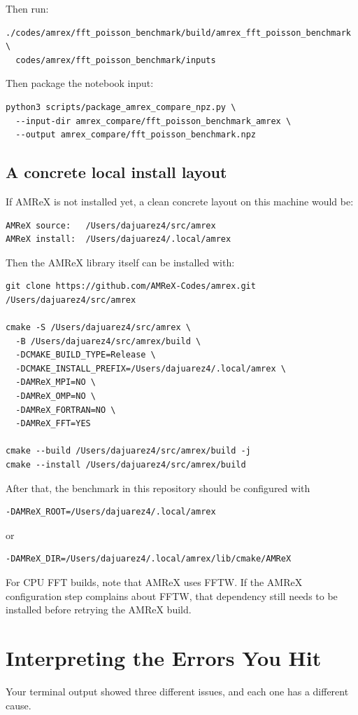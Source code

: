 \documentclass[11pt]{article}
\begin{document}
Then run:
\begin{verbatim}
./codes/amrex/fft_poisson_benchmark/build/amrex_fft_poisson_benchmark \
  codes/amrex/fft_poisson_benchmark/inputs
\end{verbatim}

Then package the notebook input:
\begin{verbatim}
python3 scripts/package_amrex_compare_npz.py \
  --input-dir amrex_compare/fft_poisson_benchmark_amrex \
  --output amrex_compare/fft_poisson_benchmark.npz
\end{verbatim}

\subsection*{A concrete local install layout}
If AMReX is not installed yet, a clean concrete layout on this machine would be:
\begin{verbatim}
AMReX source:   /Users/dajuarez4/src/amrex
AMReX install:  /Users/dajuarez4/.local/amrex
\end{verbatim}

Then the AMReX library itself can be installed with:
\begin{verbatim}
git clone https://github.com/AMReX-Codes/amrex.git /Users/dajuarez4/src/amrex

cmake -S /Users/dajuarez4/src/amrex \
  -B /Users/dajuarez4/src/amrex/build \
  -DCMAKE_BUILD_TYPE=Release \
  -DCMAKE_INSTALL_PREFIX=/Users/dajuarez4/.local/amrex \
  -DAMReX_MPI=NO \
  -DAMReX_OMP=NO \
  -DAMReX_FORTRAN=NO \
  -DAMReX_FFT=YES

cmake --build /Users/dajuarez4/src/amrex/build -j
cmake --install /Users/dajuarez4/src/amrex/build
\end{verbatim}

After that, the benchmark in this repository should be configured with
\begin{verbatim}
-DAMReX_ROOT=/Users/dajuarez4/.local/amrex
\end{verbatim}
or
\begin{verbatim}
-DAMReX_DIR=/Users/dajuarez4/.local/amrex/lib/cmake/AMReX
\end{verbatim}

For CPU FFT builds, note that AMReX uses FFTW. If the AMReX configuration step complains about FFTW, that dependency still needs to be installed before retrying the AMReX build.

\section{Interpreting the Errors You Hit}
Your terminal output showed three different issues, and each one has a different cause.
\end{document}
